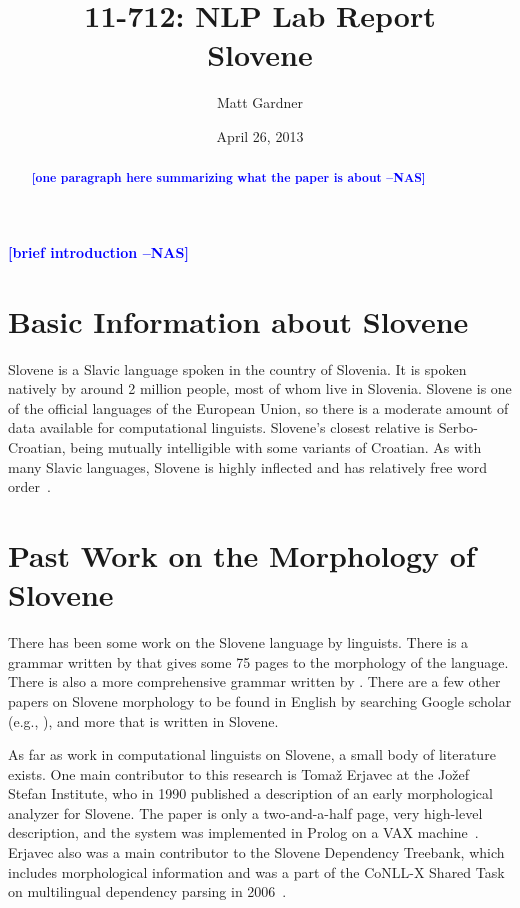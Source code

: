 \documentclass[11pt,letterpaper]{article}
\title{11-712:  NLP Lab Report\\Slovene}
\author{Matt Gardner}
\date{April 26, 2013}
\newcommand{\nascomment}[1]{\textcolor{blue}{\textbf{[#1 --NAS]}}}
\begin{document}
\maketitle
\begin{abstract}
\nascomment{one paragraph here summarizing what the paper is about}
\end{abstract}

\nascomment{brief introduction}

\section{Basic Information about Slovene}

Slovene is a Slavic language spoken in the country of Slovenia.  It is spoken
natively by around 2 million people, most of whom live in Slovenia.  Slovene is
one of the official languages of the European Union, so there is a moderate
amount of data available for computational linguists.  Slovene's closest
relative is Serbo-Croatian, being mutually intelligible with some variants of
Croatian.  As with many Slavic languages, Slovene is highly inflected and has
relatively free word order~\citep{wikipedia-slovene}.

\section{Past Work on the Morphology of Slovene}

There has been some work on the Slovene language by linguists.  There is a
grammar written by \cite{greenberg-2006-slovene-grammar} that gives some 75
pages to the morphology of the language.  There is also a more comprehensive
grammar written by \cite{herrity-2000-slovene-grammar}.  There are a few other
papers on Slovene morphology to be found in English by searching Google scholar
(e.g., \cite{bidwell-1969-outline-slovene-morphology}), and more that is
written in Slovene.

As far as work in computational linguists on Slovene, a small body of
literature exists.  One main contributor to this research is Toma\v{z} Erjavec
at the Jo\v{z}ef Stefan Institute, who in 1990 published a description of an
early morphological analyzer for Slovene.  The paper is only a two-and-a-half
page, very high-level description, and the system was implemented in Prolog on
a VAX machine~\citep{erjavec-1990-slovene-analyzer}.  Erjavec also was a main
contributor to the Slovene Dependency Treebank, which includes morphological
information and was a part of the CoNLL-X Shared Task on multilingual
dependency parsing in 2006~\citep{dvzeroski-2006-sdt}.
\end{document}

